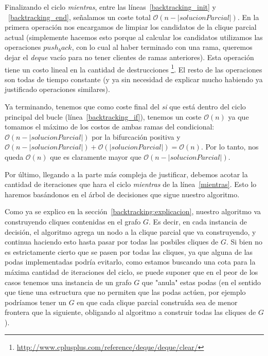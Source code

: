 \par Finalizando el ciclo \emph{mientras}, entre las l\'ineas~\ref{backtracking_init} y%
    ~\ref{backtracking_end}, se\~nalamos un coste total $\mathcal O(n -|solucionParcial|)$.
    En la primera operaci\'on nos encargamos de limpiar los candidatos de la clique
    parcial actual (simplemente hacemos esto porque al calcular los candidatos
    utilizamos las operaciones $push_back$, con lo cual al haber terminado con una rama,
    queremos dejar el \emph{deque} vac\'io para no tener clientes de ramas
    anteriores). Esta operaci\'on tiene un costo lineal en la cantidad de destrucciones%
    \footnote{\url{http://www.cplusplus.com/reference/deque/deque/clear/}}. El resto
    de las operaciones son todas de tiempo constante (y ya sin necesidad de explicar
    mucho habiendo ya justificado operaciones similares).

\par Ya terminando, tenemos que como coste final del \emph{si} que est\'a dentro
    del ciclo principal del bucle (l\'inea~\ref{backtracking_if}), tenemos un
    coste $\mathcal O(n)$ ya que tomamos el m\'aximo de los costos de ambas
    ramas del condicional: $\mathcal O(n-|solucionParcial|)$ por la bifurcaci\'on
    positiva y $\mathcal O(n-|solucionParcial|) + \mathcal O(|solucionParcial|) =
    \mathcal O(n)$. Por lo tanto, nos queda $\mathcal O(n)$ que es claramente
    mayor que $\mathcal O(n-|solucionParcial|)$.

\par Por \'ultimo, llegando a la parte m\'as compleja de justificar, debemos
    acotar la cantidad de iteraciones que hara el ciclo \emph{mientras} de la
    l\'inea~\ref{mientras}. Esto lo haremos bas\'andonos en el \'arbol de
    decisiones que sigue nuestro algoritmo.

\par Como ya se explico en la secci\'on~\ref{backtracking:explicacion}, nuestro
    algoritmo va construyendo cliques contenidas en el grafo $G$. Es decir, en cada
    instancia de decisi\'on, el algoritmo agrega un nodo a la clique parcial que va
    construyendo, y continua haciendo esto hasta pasar por todas las posbiles
    cliques de $G$. Si bien no es estrictamente cierto que se pasen por todas las cliques,
    ya que alguna de las podas implementadas podr\'ia evitarlo,
    como estamos buscando una cota para la m\'axima cantidad de iteraciones
    del ciclo, se puede suponer que en el peor de los casos tenemos una instancia
    de un grafo $G$ que "anula" estas podas (en el sentido que tiene una estructura
    que no permiten que las podas act\'uen, por ejemplo podr\'iamos tener un $G$ en
    que cada clique parcial constru\'ida sea de menor frontera que la siguiente,
    obligando al algoritmo a construir todas las cliques de $G$).

